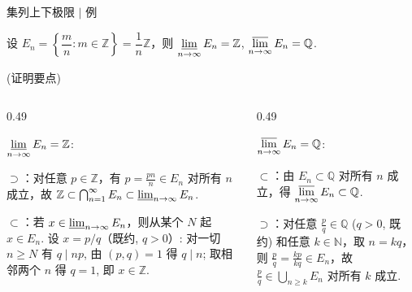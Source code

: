 \begin{frame}{集列上下极限 \texorpdfstring{$|$}{|} 例}

\begin{eg}
设 $E_n = \left\{ \dfrac{m}{n} : m \in \mathbb{Z} \right\} = \dfrac{1}{n}\mathbb{Z}$，则
$\displaystyle \varliminf_{n\to\infty} E_n = \mathbb{Z}$, $\displaystyle \varlimsup_{n\to\infty} E_n = \mathbb{Q}$.
\end{eg}

\pause

\startproof[bg=yellow, fg=red](证明要点)
\vspace{0.3em}

\begin{columns}
\begin{column}[T]{0.49\textwidth}

\alert{$\displaystyle \varliminf_{n\to\infty} E_n = \mathbb{Z}$}:

\medskip
$\supset$：对任意 $p \in \mathbb{Z}$，有 $p = \frac{pn}{n} \in E_n$ 对所有 $n$ 成立，故 $\mathbb{Z} \subset \bigcap_{n=1}^\infty E_n \subset \varliminf_{n\to\infty} E_n$.

\medskip
$\subset$：若 $x \in \varliminf_{n\to\infty} E_n$，则从某个 $N$ 起 $x \in E_n$. 设 $x = p/q$（既约, $q > 0$）: 对一切 $n \geqslant N$ 有 $q \mid np$, 由 $(p, q) = 1$ 得 $q \mid n$; 取相邻两个 $n$ 得 $q = 1$, 即 $x \in \mathbb{Z}$.

\end{column}
\begin{column}[T]{0.49\textwidth}

\alert{$\displaystyle \varlimsup_{n\to\infty} E_n = \mathbb{Q}$}:

\medskip
$\subset$：由 $E_n \subset \mathbb{Q}$ 对所有 $n$ 成立，得 $\displaystyle \varlimsup_{n\to\infty} E_n \subset \mathbb{Q}$.

\medskip
$\supset$：对任意 $\frac{p}{q} \in \mathbb{Q}$ ($q > 0$, 既约) 和任意 $k \in \mathbb{N}$，取 $n = kq$，则 $\frac{p}{q} = \frac{kp}{kq} \in E_n$，故 $\frac{p}{q} \in \bigcup_{n \geqslant k} E_n$ 对所有 $k$ 成立.

\end{column}
\end{columns}

\end{frame}




